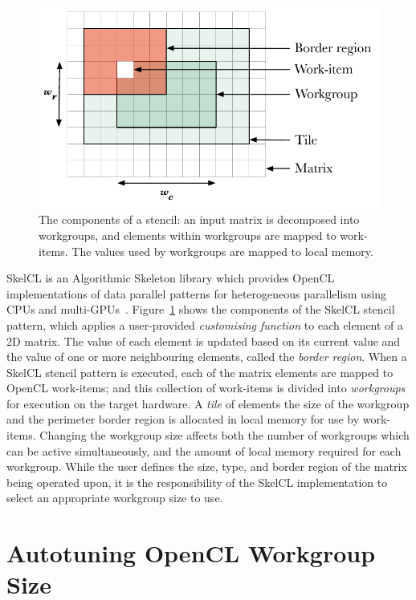 \documentclass[hidelinks]{acaces}
\begin{document}
\begin{figure}
\includegraphics[width=.38\textwidth]{stencil}
\caption[Stencil border region]{%
  The components of a stencil: an input matrix is decomposed into
  workgroups, and elements within workgroups are mapped to work-items.
  The values used by workgroups are mapped to local memory.%
  \vspace{-.75em} }
\label{fig:stencil-shape}
\end{figure}

SkelCL is an Algorithmic Skeleton library which provides OpenCL
implementations of data parallel patterns for heterogeneous
parallelism using CPUs and
multi-GPUs~\cite{Steuwer2011}. Figure~\ref{fig:stencil-shape} shows
the components of the SkelCL stencil pattern, which applies a
user-provided \emph{customising function} to each element of a 2D
matrix. The value of each element is updated based on its current
value and the value of one or more neighbouring elements, called the
\emph{border region}. When a SkelCL stencil pattern is executed, each
of the matrix elements are mapped to OpenCL work-items; and this
collection of work-items is divided into \emph{workgroups} for
execution on the target hardware. A \emph{tile} of elements the size
of the workgroup and the perimeter border region is allocated in local
memory for use by work-items. Changing the workgroup size affects both
the number of workgroups which can be active simultaneously, and the
amount of local memory required for each workgroup. While the user
defines the size, type, and border region of the matrix being operated
upon, it is the responsibility of the SkelCL implementation to select
an appropriate workgroup size to use.

\section{Autotuning OpenCL Workgroup Size}
\end{document}
